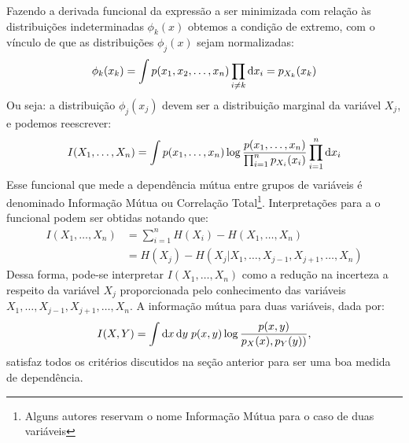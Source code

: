 Fazendo a derivada funcional da expressão a ser minimizada com relação às distribuições indeterminadas $\phi_k(x)$ obtemos a condição de extremo, com o vínculo de que as distribuições $\phi_j(x)$ sejam normalizadas:
\begin{equation}
 \phi_k(x_k) = \int  p(x_1, x_2, \ldots, x_n) \prod_{i\ne k}\mathrm{d} x_i = p_{X_k}(x_k)
\end{equation}
Ou seja: a distribuição $\phi_j(x_j)$ devem ser a distribuição marginal da variável $X_j$, e podemos reescrever:
\begin{equation}
\label{eq:infomutua2}
 I(X_1,\ldots, X_n) = \int p(x_1,\ldots, x_n) \log \frac{p(x_1,\ldots, x_n)}{\prod_{i=1}^{n} p_{X_i}(x_i)} \prod_{i=1}^{n}\ud x_i
\end{equation}
Esse funcional que mede a dependência mútua entre grupos de variáveis é denominado Informação Mútua ou Correlação Total\footnote{Alguns autores reservam o nome Informação Mútua para o caso de duas variáveis}. Interpretações para a o funcional podem ser obtidas notando que:
\begin{align}
 I(X_1,\ldots, X_n) &= \sum_{i=1}^{n} H(X_i) - H(X_1, \ldots, X_n)  \label{eq:entropydecomposition}\\
		    &= H(X_j) - H(X_j | X_1, \ldots, X_{j-1}, X_{j+1}, \ldots, X_n) 
\end{align}
Dessa forma, pode-se interpretar $I(X_1, \ldots, X_n)$ como a redução na incerteza a respeito da variável $X_j$ proporcionada pelo conhecimento das variáveis $X_1, \ldots, X_{j-1}, X_{j+1}, \ldots, X_n$. A informação mútua para duas variáveis, dada por:
\begin{equation}
\label{eq:infomutuabiv}
 I(X,Y) = \int \ud x\,\ud y\; p(x, y) \log \frac{p(x, y)}{p_{X}(x),p_{Y}(y))},
\end{equation}
satisfaz todos os critérios discutidos na seção anterior para ser uma boa medida de dependência. 
